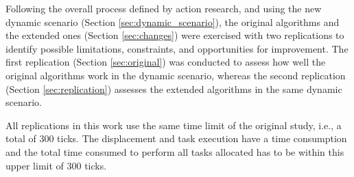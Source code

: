Following the overall process defined by action research, and using the new dynamic scenario (Section \ref{sec:dynamic_scenario}), the original algorithms and the extended ones (Section \ref{sec:changes}) were exercised with two replications to identify possible limitations, constraints, and opportunities for improvement. The first replication (Section \ref{sec:original}) was conducted to assess how well the original algorithms work in the dynamic scenario, whereas the second replication (Section \ref{sec:replication}) assesses the extended algorithms in the same dynamic scenario.

All replications in this work use the same time limit of the original study, i.e., a total of 300 ticks. The displacement and task execution have a time consumption and the total time consumed to perform all tasks allocated has to be within this upper limit of 300 ticks.

